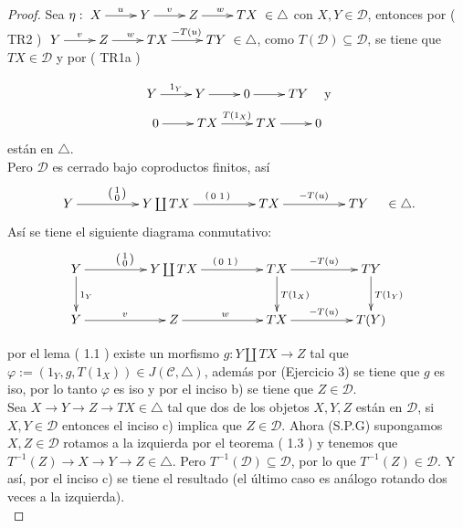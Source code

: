 \documentclass{article}
\begin{document}
\begin{enumerate}[label=\textbf{Ej \arabic*.}]
\begin{proof}
			 Sea $\eta: \xymatrix{X\ar[r]^u & Y\ar[r]^v & Z\ar[r]^w & TX } \in \triangle$ con $X,Y\in \mathscr{D}$, entonces por ( TR2 ) 
			$\xymatrix{Y\ar[r]^v & Z\ar[r]^w & TX\ar[r]^{-T(u)} & TY} \in \triangle$, como $T(\mathscr{D})\subseteq \mathscr{D}$, se tiene que $TX\in 
			\mathscr{D}$ y por ( TR1a ) 
			
			\begin{gather*}
				\xymatrix{Y\ar[r]^{1_Y}&Y\ar[r]&0\ar[r]&TY}\quad \text{y}\\
				\xymatrix{0\ar[r]&TX\ar[r]^{T(1_{X})}&TX\ar[r]&0}
			\end{gather*}
			están en $\triangle$.\\
			
			Pero $\mathscr{D}$ es cerrado bajo coproductos finitos, así 
			\begin{equation*}
				\xymatrix@C+2pc{Y\ar[r]^{\spmat{1 \\ 0}} & Y\coprod TX\ar[r]^{\spmat{ 0 & 1}} & TX\ar[r]^{-T(u)} & TY}\quad \in \triangle .
			\end{equation*}
			Así se tiene el siguiente diagrama conmutativo:\\
			
			
			\begin{equation*}
				\xymatrix@C+2pc{Y\ar[r]^{\spmat{1 \\ 0}}\ar[d]^{1_Y} & Y\coprod TX\ar[r]^{\spmat{ 0 & 1}} & TX\ar[d]^{T(1_X)}\ar[r]^{-T(u)} 
					& TY\ar[d]^{T(1_Y)}\\
					Y\ar[r]^v & Z\ar[r]^w & TX\ar[r]^{-T(u)} & T(Y)}
			\end{equation*}
			
			por el lema ( 1.1 ) existe un morfismo $g:Y\coprod TX\longrightarrow Z$ tal que \\$\varphi:=(1_Y,g,T(1_X))\in J(\mathscr{C},\triangle)$, además por
			(Ejercicio 3) se tiene que $g$ es iso, por lo tanto $\varphi$ es iso y por el inciso b) se tiene que $Z\in \mathscr{D}$.\\
			
			 Sea $X\to Y\to Z\to TX \in \triangle$ tal que dos de los objetos $X,Y,Z$ están en $\mathscr{D}$, si $X,Y\in \mathscr{D}$ entonces el 
			inciso c) implica que $Z\in \mathscr{D}$. Ahora (S.P.G) supongamos $X,Z\in \mathscr{D}$ rotamos a la izquierda por el teorema ( 1.3 ) y tenemos 
			que $T^{-1}(Z)\to X\to Y\to Z\in \triangle$. Pero $T^{-1}(\mathscr{D})\subseteq \mathscr{D}$, por lo que $T^{-1}(Z)\in \mathscr{D}$. 
			Y así, por el inciso c) se tiene el resultado (el último caso es análogo rotando dos veces a la izquierda).\\
			

\end{proof}
\end{enumerate}
\end{document}
